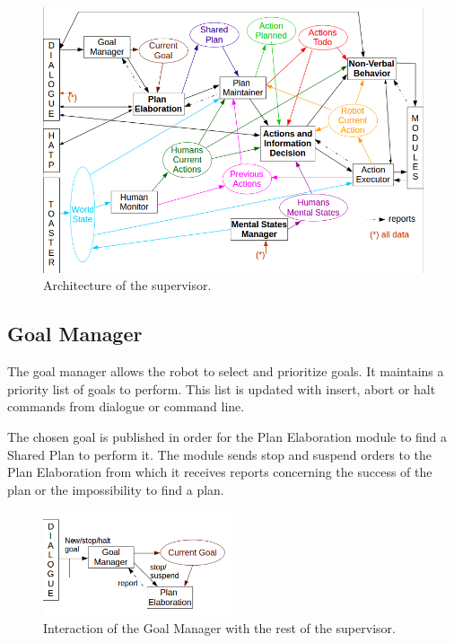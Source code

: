 \documentclass[english,a4paper,11pt,twoside]{StyleThese}
\begin{document}
\begin{figure}[!h]
	\centering
    \includegraphics[width=\textwidth]{figs/Chapter2/ArchiSup.png}
    \caption{Architecture of the supervisor.}
    \label{fig:archiSup}
\end{figure}

\subsection{Goal Manager}

The goal manager allows the robot to select and prioritize goals. It maintains a priority list of goals to perform. This list is updated with insert, abort or halt commands from dialogue or command line.

The chosen goal is published in order for the Plan Elaboration module to find a Shared Plan to perform it. The module sends stop and suspend orders to the Plan Elaboration from which it receives reports concerning the success of the plan or the impossibility to find a plan.

\begin{figure}[!h]
	\centering
    \includegraphics[width=0.5\textwidth]{figs/Chapter2/GoalManager.png}
    \caption{Interaction of the Goal Manager with the rest of the supervisor.}
    \label{fig:goalManager}
\end{figure}
\end{document}
